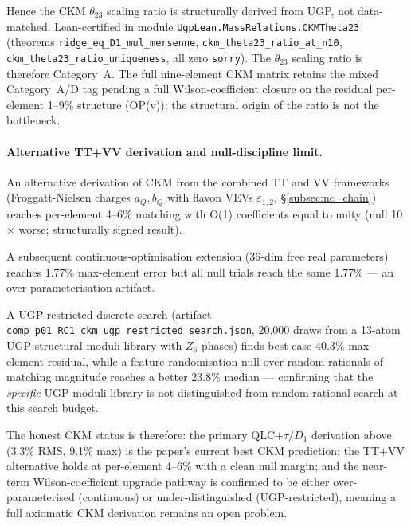 \documentclass[11pt]{article}
\theoremstyle{remark}
\begin{document}
\smallskip
Hence the CKM $\theta_{23}$ scaling ratio is structurally derived from UGP,
not data-matched.  Lean-certified in module
\texttt{UgpLean.MassRelations.CKMTheta23}
(theorems \texttt{ridge\_eq\_D1\_mul\_mersenne}, \texttt{ckm\_theta23\_ratio\_at\_n10},
\texttt{ckm\_theta23\_ratio\_uniqueness}, all zero \texttt{sorry}).
The $\theta_{23}$ scaling ratio is therefore Category~A.
The full nine-element CKM matrix retains the mixed Category~A/D tag pending a full
Wilson-coefficient closure on the residual per-element 1--9\% structure (OP(v));
the structural origin of the ratio is not the bottleneck.

\paragraph{Alternative TT+VV derivation and null-discipline limit.}
An alternative derivation of CKM from the combined TT and VV frameworks (Froggatt-Nielsen charges $a_Q, b_Q$ with flavon VEVs $\varepsilon_{1,2}$, \S\ref{subsec:nc_chain}) reaches per-element 4--6\% matching with O(1) coefficients equal to unity (null 10$\times$ worse; structurally signed result).

\smallskip
A subsequent continuous-optimisation extension (36-dim free real parameters) reaches 1.77\% max-element error but all null trials reach the same 1.77\% --- an over-parameterisation artifact.

\smallskip
A UGP-restricted discrete search (artifact \texttt{comp\_p01\_RC1\_ckm\_ugp\_restricted\_search.json}, 20{,}000 draws from a 13-atom UGP-structural moduli library with $Z_6$ phases) finds best-case $40.3\%$ max-element residual, while a feature-randomisation null over random rationals of matching magnitude reaches a better 23.8\% median --- confirming that the \emph{specific} UGP moduli library is not distinguished from random-rational search at this search budget.

\smallskip
The honest CKM status is therefore: the primary QLC$+\tau/D_1$ derivation above (3.3\% RMS, 9.1\% max) is the paper's current best CKM prediction; the TT+VV alternative holds at per-element 4--6\% with a clean null margin; and the near-term Wilson-coefficient upgrade pathway is confirmed to be either over-parameterised (continuous) or under-distinguished (UGP-restricted), meaning a full axiomatic CKM derivation remains an open problem.
\end{document}

